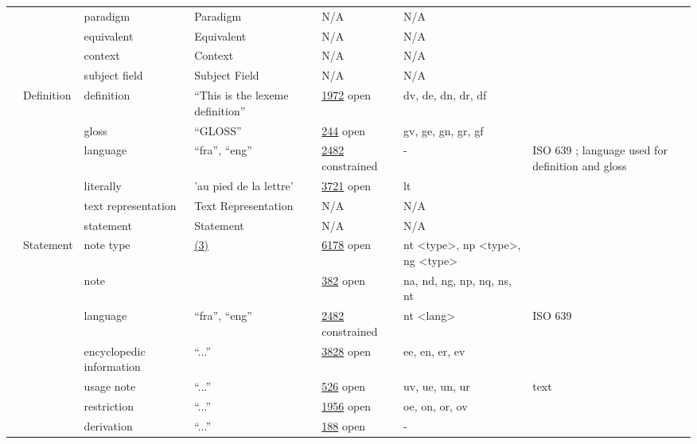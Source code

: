 \documentclass[a4paper,12pt]{article}
\begin{document}
\begin{center}
\begin{longtable}{*7{p{2cm}}}
& & paradigm & Paradigm & N/A & N/A & \\ \cmidrule{3-7}
& & equivalent & Equivalent & N/A & N/A & \\ \cmidrule{3-7}
& & context & Context & N/A & N/A & \\ \cmidrule{3-7}
& & subject field & Subject Field & N/A & N/A & \\ \cmidrule{2-7}
& \multirow{6}{2cm}{Definition} & definition & ``This is the lexeme definition'' & \href{http://www.isocat.org/datcat/DC-1972}{1972} open & dv, de, dn, dr, df & \\ \cmidrule{3-7}
& & gloss & ``\scshape{GLOSS}'' & \href{http://www.isocat.org/datcat/DC-244}{244} open & gv, ge, gn, gr, gf & \\ \cmidrule{3-7}
& & language & ``fra'', ``eng'' & \href{http://www.isocat.org/datcat/DC-2482}{2482} constrained & - & ISO 639 ; language used for definition and gloss \\ \cmidrule{3-7}
& & literally & 'au pied de la lettre' & \href{http://www.isocat.org/datcat/DC-3721}{3721} open & lt & \\ \cmidrule{3-7}
& & text representation & Text Re\-pre\-sen\-ta\-tion & N/A & N/A & \\ \cmidrule{3-7}
& & statement & Statement & N/A & N/A & \\ \cmidrule{2-7}
& \multirow{8}{2cm}{Statement} & note type & \hyperlink{3}{(3)} \hypertarget{nt}{} & \href{http://www.isocat.org/datcat/DC-6178}{6178} open & nt \textless type\textgreater, np \textless type\textgreater, ng \textless type\textgreater & \\ \cmidrule{3-7}
& & note & & \href{http://www.isocat.org/datcat/DC-382}{382} open & na, nd, ng, np, nq, ns, nt & \\ \cmidrule{3-7}
& & language & ``fra'', ``eng'' & \href{http://www.isocat.org/datcat/DC-2482}{2482} constrained & nt \textless lang\textgreater & ISO 639 \\ \cmidrule{3-7}
& & encyclopedic information & ``...'' & \href{http://www.isocat.org/datcat/DC-3828}{3828} open & ee, en, er, ev & \\ \cmidrule{3-7}
& & usage note & ``...'' & \href{http://www.isocat.org/datcat/DC-526}{526} open & uv, ue, un, ur & text \\ \cmidrule{3-7}
& & restriction & ``...'' & \href{http://www.isocat.org/datcat/DC-1956}{1956} open & oe, on, or, ov & \\ \cmidrule{3-7}
& & derivation & ``...'' & \href{http://www.isocat.org/datcat/DC-188}{188} open & - & \\ \cmidrule{3-7}

\end{longtable}
\end{center}
\end{document}
